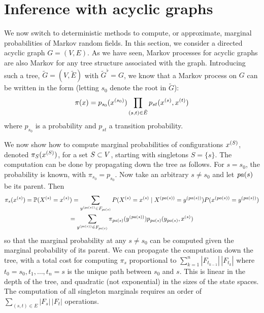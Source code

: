 \section{Inference with acyclic graphs}
\label{sec:inf.acyc}

We now switch to deterministic methods to compute, or approximate, marginal probabilities of Markov random fields. In this section, we consider a directed acyclic graph $G = (V,E)$.
As we have seen, Markov processes for acyclic graphs are also Markov
for any tree structure associated with the graph. Introducing such a
tree, $\tilde G = (V, \tilde E)$ with $\tilde G^\flat = G$, we know
that a Markov process on $G$ can be written in the form (letting $s_0$
denote the root in $\tilde G$):
\begin{equation}
\label{eq:tree.assume}
\pi(x) = p_{s_0}(x^{(s_0)}) \prod_{(s,t)\in \tilde E} p_{st}(x^{(s)}, x^{(t)})
\end{equation}
where $p_{s_0}$ is a probability and $p_{st}$ a transition
probability.

We now show how to compute marginal probabilities of configurations
$x^{(S)}$, denoted $\pi_S(x^{(S)})$,  for a set $S\subset V$, starting with singletons $S = \{s\}$. The computation can be done by propagating down the tree as
follows. For $s=s_0$, the probability is known, with
$\pi_{s_0} = p_{s_0}$. Now take an arbitrary $s\neq s_0$ and let ${\mathit{pa}(s)}$
be its parent. Then
\begin{multline*}
\pi_s(x^{(s)}) = \bm{\mathbb P}(X^{(s)} = x^{(s)}) = \sum_{y^{({\mathit{pa}(s)})}\in F_{{\mathit{pa}(s)}}} P(X^{(s)} =
x^{(s)} \mid X^{({\mathit{pa}(s)})} = y^{({\mathit{pa}(s)})}) P(x^{({\mathit{pa}(s)})} = y^{({\mathit{pa}(s)})}) \\
=
\sum_{y^{({\mathit{pa}(s)})}\in F_{{\mathit{pa}(s)}}} \pi_{{\mathit{pa}(s)}}(y^{({\mathit{pa}(s)})}) p_{{\mathit{pa}(s)}}(y_{{\mathit{pa}(s)}}, x^{(s)})
  \end{multline*}
so that the marginal probability at any $s\neq s_0$ can be computed
given the marginal probability of its parent. We can propagate the
computation down the tree, with a total cost for computing $\pi_s$
proportional to $\sum_{k=1}^n |F_{t_{k-1}}|\,|F_{t_k}|$ where $t_0=s_0, t_1,
\ldots, t_n=s$ is the unique path between $s_0$ and $s$. This is
linear in the depth of the tree, and quadratic (not exponential) in
the sizes of the state spaces.
The
computation of all singleton marginals requires 
an order of $\sum_{(s,t)\in E} |F_s|\,|F_t|$ operations. 

